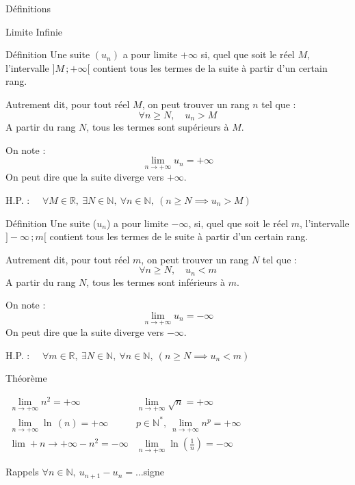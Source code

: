 \documentclass{coursbook}
\begin{document}
    \begin{Gpartie}{Définitions} 
        \begin{Spartie}{Limite Infinie}
            \vspace*{-2ex}
            \begin{SSpartie}{Définition} 
                Une suite $(u_n)$ a pour limite $+\infty$ si, quel que soit le réel $M$, l'intervalle $\big]M\,;+\infty\big[$ contient tous les termes de la suite à partir d'un certain rang.

                Autrement dit, pour tout réel $M$, on peut trouver un rang $n$ tel que : \[\forall n\geq N,\quad u_n>M\]
                A partir du rang $N$, tous les termes sont supérieurs à $M$.

                On note : \[\boxed{\lim\limits_{n\to +\infty} u_n=+\infty}\] On peut dire que la suite diverge vers $+\infty$.

                H.P. : $\quad\forall M\in\mathbb{R},~\exists N\in\mathbb{N},~\forall n\in\mathbb{N},~(n\geq N\implies u_n>M)$
            \end{SSpartie}
            \begin{SSpartie}{Définition} 
                Une suite ($u_n$) a pour limite $-\infty$, si, quel que soit le réel $m$, l'intervalle $\big]-\infty\,; m\big[$ contient tous les termes de le suite à partir d'un certain rang.

                Autrement dit, pour tout réel $m$, on peut trouver un rang $N$ tel que : \[\forall n\geq N,\quad u_n<m\]
                A partir du rang $N$, tous les termes sont inférieurs à $m$.

                On note : \[\boxed{\lim\limits_{n\to +\infty} u_n=-\infty}\] On peut dire que la suite diverge vers $-\infty$.

                H.P. : $\quad\forall m\in\mathbb{R},~\exists N\in\mathbb{N},~\forall n\in\mathbb{N},~(n\geq N\implies u_n<m)$
            \end{SSpartie}
            \begin{SSpartie}{Théorème}
                \begin{center}$\begin{array}{cc}
                    \lim\limits_{n\to +\infty} n^2=+\infty & \lim\limits_{n\to +\infty} \sqrt{n}=+\infty \\
    
                    \lim\limits_{n\to +\infty} \ln\,(n)=+\infty & p\in\mathbb{N^*},\ \lim\limits_{n\to +\infty} n^p=+\infty \\
                    \lim\limits+{n\to +\infty} -n^2=-\infty & \lim\limits_{n\to +\infty} \ln\left(\frac{1}{n}\right)=-\infty
                \end{array}$\end{center}
            \end{SSpartie}
            \begin{SSpartie}{Rappels} 
                $\forall n\in\mathbb{N},\ u_{n+1}-u_n=\dotsc$\quad signe


\end{SSpartie}
\end{Spartie}
\end{Gpartie}
\end{document}

